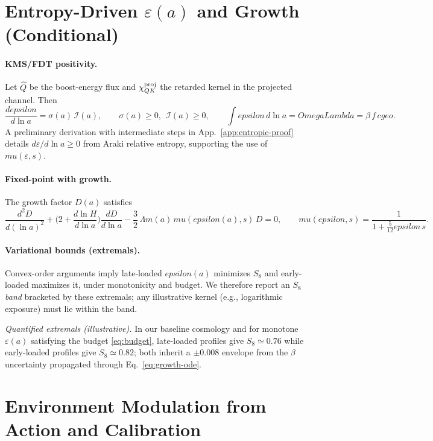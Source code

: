 \documentclass[aps,prd,onecolumn,superscriptaddress,nofootinbib]{revtex4-2}
\def\OmL{OmegaLambda}%
\def\cgeo{cgeo}%
\def\eps{epsilon}%
\def\mu{mu}%
\def\Omega_\Lambda{OmegaLambda}%
\providecommand{\OmL}{\Omega_\Lambda}
\providecommand{\cgeo}{c_{\rm geo}}
\providecommand{\eps}{\varepsilon}
\providecommand{\be}{\begin{equation}}
\providecommand{\ee}{\end{equation}}
\begin{document}
\section{Entropy-Driven \texorpdfstring{$\varepsilon(a)$}{epsilon(a)} and Growth (Conditional)}
\label{sec:epsilon}

\paragraph{KMS/FDT positivity.}
Let \(\hat Q\) be the boost-energy flux and \(\chi_{QK}^{\rm proj}\) the retarded kernel in the projected channel. Then
\be
\frac{d\eps}{d\ln a}=\sigma(a)\,\mathcal I(a),\qquad \sigma(a)\ge 0,\ \ \mathcal I(a)\ge 0,\qquad
\int \eps\,d\ln a=\OmL=\beta\,f\,\cgeo.
\ee
A preliminary derivation with intermediate steps in App.~\ref{app:entropic-proof} details \(d\varepsilon/d\ln a \ge 0\) from Araki relative entropy, supporting the use of \(\mu(\varepsilon,s)\).

\paragraph{Fixed-point with growth.}
The growth factor \(D(a)\) satisfies
\be
\label{eq:growth-ode}
\frac{d^2 D}{d(\ln a)^2}
+\Big(2+\frac{d\ln H}{d\ln a}\Big)\frac{dD}{d\ln a}
-\frac{3}{2}\,\Omega_m(a)\,\mu(\eps(a),s)\,D=0,\qquad
\mu(\eps,s)=\frac{1}{1+\tfrac{5}{12}\eps\,s}.
\ee

\paragraph{Variational bounds (extremals).}
Convex-order arguments imply late-loaded \(\eps(a)\) minimizes \(S_8\) and early-loaded maximizes it, under monotonicity and budget. We therefore report an \(S_8\) \emph{band} bracketed by these extremals; any illustrative kernel (e.g., logarithmic exposure) must lie within the band.

\noindent\emph{Quantified extremals (illustrative).} In our baseline cosmology and for monotone \(\varepsilon(a)\) satisfying the budget \eqref{eq:budget}, late-loaded profiles give \(S_8\simeq 0.76\) while early-loaded profiles give \(S_8\simeq 0.82\); both inherit a \(\pm 0.008\) envelope from the \(\beta\) uncertainty propagated through Eq.~\eqref{eq:growth-ode}.

\section{Environment Modulation from Action and Calibration}
\label{sec:env}
\end{document}
